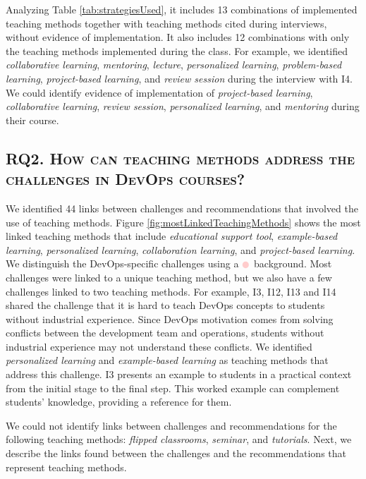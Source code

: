 \documentclass[10pt,conference]{IEEEtran}
\begin{document}
Analyzing Table \ref{tab:strategiesUsed}, it includes 13 combinations of implemented teaching methods together with teaching methods cited during interviews, without evidence of implementation. It also includes 12 combinations with only the teaching methods implemented during the class. For example, we identified \textsl{collaborative learning}, \textsl{mentoring}, \textsl{lecture}, \textsl{personalized learning}, \textsl{problem-based learning}, \textsl{project-based learning}, and \textsl{review session} during the interview with I4. We could identify evidence of implementation of \textsl{project-based learning}, \textsl{collaborative learning}, \textsl{review session}, \textsl{personalized learning}, and \textsl{mentoring} during their course. 



\subsection{RQ2. \textsc{How can teaching methods address the challenges in DevOps courses?}}


We identified 44 links between challenges and recommendations that involved the use of teaching methods. Figure \ref{fig:mostLinkedTeachingMethods} shows the most linked teaching methods that include \textsl{educational support tool}, \textsl{example-based learning}, \textsl{personalized learning}, \textsl{collaboration learning}, and \textsl{project-based learning}. We distinguish the DevOps-specific challenges using a $\textcolor{devopsSpecificChallenges}{\CIRCLE}$ background. Most challenges were linked to a unique teaching method, but we also have a few challenges linked to two teaching methods. For example, I3, I12, I13 and I14 shared the challenge that it is hard to teach DevOps concepts to students without industrial experience. Since DevOps motivation comes from solving conflicts between the development team and operations, students without industrial experience may not understand these conflicts. We identified \textsl{personalized learning} and \textsl{example-based learning} as teaching methods that address this challenge. I3 presents an example to students in a practical context from the initial stage to the final step. This worked example can complement students’ knowledge, providing a reference for them.

We could not identify links between challenges and recommendations for the following teaching methods:  \textsl{flipped classrooms}, \textsl{seminar},  and \textsl{tutorials}. Next, we describe the links found between the challenges and the recommendations that represent teaching methods. 
\end{document}
